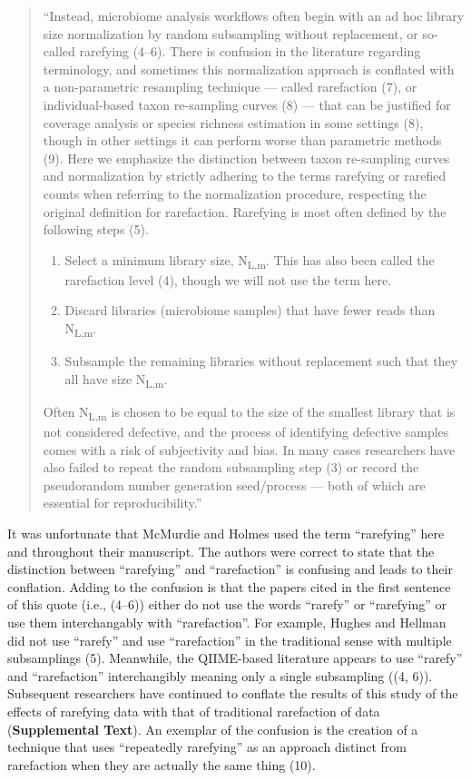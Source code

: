 \documentclass[
]{article}
\providecommand{\tightlist}{%
  \setlength{\itemsep}{0pt}\setlength{\parskip}{0pt}}
\begin{document}
\begin{quote}
``Instead, microbiome analysis workflows often begin with an ad hoc
library size normalization by random subsampling without replacement, or
so-called rarefying (4--6). There is confusion in the literature
regarding terminology, and sometimes this normalization approach is
conflated with a non-parametric resampling technique --- called
rarefaction (7), or individual-based taxon re-sampling curves (8) ---
that can be justified for coverage analysis or species richness
estimation in some settings (8), though in other settings it can perform
worse than parametric methods (9). Here we emphasize the distinction
between taxon re-sampling curves and normalization by strictly adhering
to the terms rarefying or rarefied counts when referring to the
normalization procedure, respecting the original definition for
rarefaction. Rarefying is most often defined by the following steps (5).

\begin{enumerate}
\def\labelenumi{\arabic{enumi}.}
\tightlist
\item
  Select a minimum library size, N\textsubscript{L,m}. This has also
  been called the rarefaction level (4), though we will not use the term
  here.
\item
  Discard libraries (microbiome samples) that have fewer reads than
  N\textsubscript{L,m}.
\item
  Subsample the remaining libraries without replacement such that they
  all have size N\textsubscript{L,m}.
\end{enumerate}

Often N\textsubscript{L,m} is chosen to be equal to the size of the
smallest library that is not considered defective, and the process of
identifying defective samples comes with a risk of subjectivity and
bias. In many cases researchers have also failed to repeat the random
subsampling step (3) or record the pseudorandom number generation
seed/process --- both of which are essential for reproducibility.''
\end{quote}

It was unfortunate that McMurdie and Holmes used the term ``rarefying''
here and throughout their manuscript. The authors were correct to state
that the distinction between ``rarefying'' and ``rarefaction'' is
confusing and leads to their conflation. Adding to the confusion is that
the papers cited in the first sentence of this quote (i.e., (4--6))
either do not use the words ``rarefy'' or ``rarefying'' or use them
interchangably with ``rarefaction''. For example, Hughes and Hellman did
not use ``rarefy'' and use ``rarefaction'' in the traditional sense with
multiple subsamplings (5). Meanwhile, the QIIME-based literature appears
to use ``rarefy'' and ``rarefaction'' interchangibly meaning only a
single subsampling ((4, 6)). Subsequent researchers have continued to
conflate the results of this study of the effects of rarefying data with
that of traditional rarefaction of data (\textbf{Supplemental Text}). An
exemplar of the confusion is the creation of a technique that uses
``repeatedly rarefying'' as an approach distinct from rarefaction when
they are actually the same thing (10).
\end{document}
